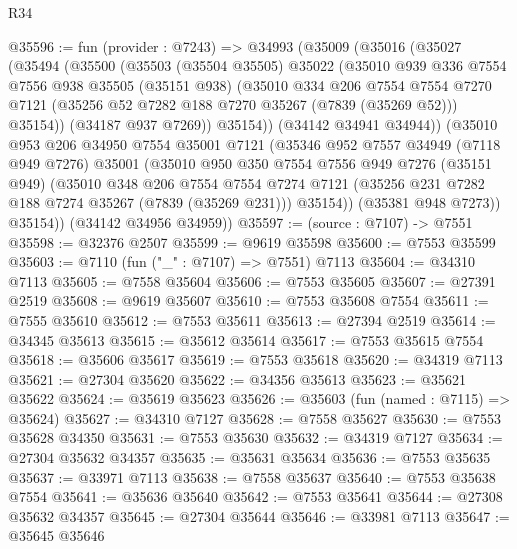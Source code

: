\begin{lexlean}{R34}
\begin{coremodule}
@35596 := fun (provider : @7243) =>
  @34993
    (@35009
      (@35016
        (@35027
          (@35494
            (@35500
              (@35503
                (@35504 @35505)
                @35022
                (@35010
                  @939
                  @336
                  @7554
                  @7556
                  @938
                  @35505
                  (@35151 @938)
                  (@35010
                    @334
                    @206
                    @7554
                    @7554
                    @7270
                    @7121
                    (@35256 @52 @7282 @188 @7270 @35267 (@7839 (@35269 @52)))
                    @35154))
                (@34187 @937 @7269))
              @35154))
          (@34142 @34941 @34944))
        (@35010
          @953
          @206
          @34950
          @7554
          @35001
          @7121
          (@35346
            @952
            @7557
            @34949
            (@7118 @949 @7276)
            @35001
            (@35010
              @950
              @350
              @7554
              @7556
              @949
              @7276
              (@35151 @949)
              (@35010
                @348
                @206
                @7554
                @7554
                @7274
                @7121
                (@35256 @231 @7282 @188 @7274 @35267 (@7839 (@35269 @231)))
                @35154))
            (@35381 @948 @7273))
          @35154))
      (@34142 @34956 @34959))
@35597 := (source : @7107) -> @7551
@35598 := @32376 @2507
@35599 := @9619 @35598
@35600 := @7553 @35599
@35603 := @7110 (fun ("_" : @7107) => @7551) @7113
@35604 := @34310 @7113
@35605 := @7558 @35604
@35606 := @7553 @35605
@35607 := @27391 @2519
@35608 := @9619 @35607
@35610 := @7553 @35608 @7554
@35611 := @7555 @35610
@35612 := @7553 @35611
@35613 := @27394 @2519
@35614 := @34345 @35613
@35615 := @35612 @35614
@35617 := @7553 @35615 @7554
@35618 := @35606 @35617
@35619 := @7553 @35618
@35620 := @34319 @7113
@35621 := @27304 @35620
@35622 := @34356 @35613
@35623 := @35621 @35622
@35624 := @35619 @35623
@35626 := @35603 (fun (named : @7115) => @35624)
@35627 := @34310 @7127
@35628 := @7558 @35627
@35630 := @7553 @35628 @34350
@35631 := @7553 @35630
@35632 := @34319 @7127
@35634 := @27304 @35632 @34357
@35635 := @35631 @35634
@35636 := @7553 @35635
@35637 := @33971 @7113
@35638 := @7558 @35637
@35640 := @7553 @35638 @7554
@35641 := @35636 @35640
@35642 := @7553 @35641
@35644 := @27308 @35632 @34357
@35645 := @27304 @35644
@35646 := @33981 @7113
@35647 := @35645 @35646

\end{coremodule}
\end{lexlean}
